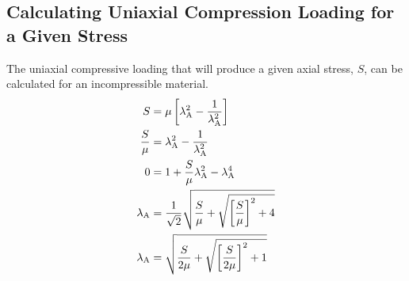 \documentclass[10pt,letterpaper,oneside]{report}
\newcommand{\scas}[1]{\mbox{{\scriptsize{${\rm{#1}}$}}}{}}
\begin{document}
\subsection{Calculating Uniaxial Compression Loading for a Given Stress}
The uniaxial compressive loading that will produce a given axial stress, $S$, can be calculated for an incompressible material.
\begin{align}
S &= \mu \left[ \lambda_{\scas{A}}^2 - \frac{1}{\lambda_{\scas{A}}^2 } \right] \\
\frac{S}{\mu} &= \lambda_{\scas{A}}^2 - \frac{1}{\lambda_{\scas{A}}^2 } \\
0 &= 1 + \frac{S}{\mu} \lambda_{\scas{A}}^2 - \lambda_{\scas{A}}^4 \\
\lambda_{\scas{A}} &= \frac{1}{\sqrt{2}} \sqrt{ \frac{S}{\mu} + \sqrt{ \left[ \frac{S}{\mu} \right]^2 + 4 } } \\
\lambda_{\scas{A}} &= \sqrt{ \frac{S}{2 \mu} + \sqrt{ \left[ \frac{S}{ 2 \mu} \right] ^2 + 1 } } 
\end{align}
\end{document}
